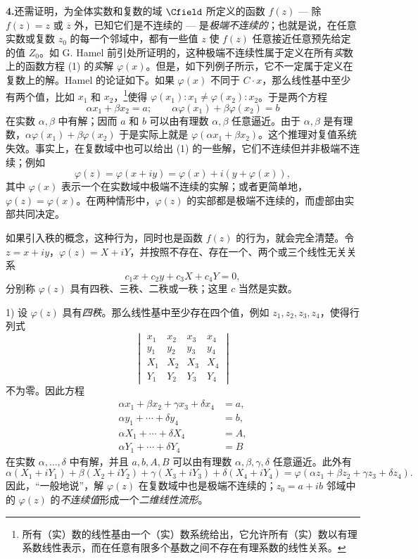 \noindent\textbf{4.}\quad 还需证明，为全体实数和复数的域 $\Cfield$ 所定义的函数 $f(z)$ --- 除 $f(z)=z$ 或 $\overline z$ 外，已知它们是不连续的 --- 是\emph{极端不连续的}；也就是说，在任意实数或复数 $z_0$ 的每一个邻域中，都有一些值 $z$ 使 $f(z)$ 任意接近任意预先给定的值 $Z_0$。如 G. Hamel 前引处所证明的，这种极端不连续性属于定义在所有\emph{实}数上的函数方程 (1) 的\emph{实}解 $\varphi(x)$。但是，如下列例子所示，它不一定属于定义在复数上的解。Hamel 的论证如下。如果 $\varphi(x)$ 不同于 $C\cdot x$，那么线性基中至少有两个值，比如 $x_1$ 和 $x_2$，\footnote{所有（实）数的线性基由一个（实）数系统给出，它允许所有（实）数以有理系数线性表示，而在任意有限多个基数之间不存在有理系数的线性关系。}使得 $\varphi(x_1):x_1\ne\varphi(x_2):x_2$。于是两个方程
\[
\alpha x_1+\beta x_2=a;\qquad \alpha\varphi(x_1)+\beta\varphi(x_2)=b
\]
在实数 $\alpha,\beta$ 中有解；因而 $a$ 和 $b$ 可以由有理数 $\alpha,\beta$ 任意逼近。由于 $\alpha,\beta$ 是有理数，$\alpha\varphi(x_1)+\beta\varphi(x_2)$ 于是实际上就是 $\varphi(\alpha x_1+\beta x_2)$。这个推理对复值系统失效。事实上，在复数域中也可以给出 (1) 的一些解，它们不连续但并非极端不连续；例如
\[
\varphi(z)=\varphi(x+iy)=\varphi(x)+i(y+\varphi(x)),
\]
其中 $\varphi(x)$ 表示一个在实数域中极端不连续的实解；或者更简单地，$\varphi(z)=\varphi(x)$。在两种情形中，$\varphi(z)$ 的实部都是极端不连续的，而虚部由实部共同决定。

如果引入秩的概念，这种行为，同时也是函数 $f(z)$ 的行为，就会完全清楚。令 $z=x+iy$，$\varphi(z)=X+iY$，并按照不存在、存在一个、两个或三个线性无关关系
\[
c_1x+c_2y+c_3X+c_4Y=0,
\]
分别称 $\varphi(z)$ 具有四秩、三秩、二秩或一秩；这里 $c$ 当然是实数。

1) 设 $\varphi(z)$ 具有\emph{四秩}。那么线性基中至少存在四个值，例如 $z_1,z_2,z_3,z_4$，使得行列式
\[
\begin{vmatrix}
x_1&x_2&x_3&x_4\\
y_1&y_2&y_3&y_4\\
X_1&X_2&X_3&X_4\\
Y_1&Y_2&Y_3&Y_4
\end{vmatrix}
\]
不为零。因此方程
\[
\begin{aligned}
\alpha x_1+\beta x_2+\gamma x_3+\delta x_4&=a,\\
\alpha y_1+\cdots+\delta y_4&=b,\\
\alpha X_1+\cdots+\delta X_4&=A,\\
\alpha Y_1+\cdots+\delta Y_4&=B
\end{aligned}
\]
在实数 $\alpha,\ldots,\delta$ 中有解，并且 $a,b,A,B$ 可以由有理数 $\alpha,\beta,\gamma,\delta$ 任意逼近。此外有
\[
\alpha(X_1+iY_1)+\beta(X_2+iY_2)+\gamma(X_3+iY_3)+\delta(X_4+iY_4)
 =\varphi(\alpha z_1+\beta z_2+\gamma z_3+\delta z_4).
\]
因此，“一般地说”，解 $\varphi(z)$ 在复数域中也是极端不连续的；$z_0=a+ib$ 邻域中的 $\varphi(z)$ 的\emph{不连续值}形成一个\emph{二维线性流形}。

